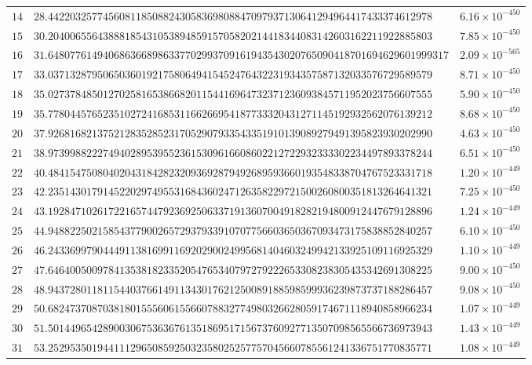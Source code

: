 \documentclass[12pt,reqno]{amsart}
\theoremstyle{remark}
\begin{document}
\begin{longtable}{clc}
$14$ & $28.4422032577456081185088243058369808847097937130641294964417433374612978$ & $6.16\times 10^{-450}$ \\
$15$ & $30.2040065564388818543105389485915705820214418344083142603162211922885803$ & $7.85\times 10^{-450}$ \\
$16$ & $31.6480776149406863668986337702993709161943543020765090418701694629601999317$ & $2.09\times 10^{-565}$ \\
$17$ & $33.0371328795065036019217580649415452476432231934357587132033576729589579$ & $8.71\times 10^{-450}$ \\
$18$ & $35.0273784850127025816538668201154416964732371236093845711952023756607555$ & $5.90\times 10^{-450}$ \\
$19$ & $35.7780445765235102724168531166266954187733320431271145192932562076139212$ & $8.68\times 10^{-450}$ \\
$20$ & $37.9268168213752128352852317052907933543351910139089279491395823930202990$ & $4.63\times 10^{-450}$ \\
$21$ & $38.9739988222749402895395523615309616608602212722932333302234497893378244$ & $6.51\times 10^{-450}$ \\
$22$ & $40.4841547508040204318428232093692879492689593660193548338704767523331718$ & $1.20\times 10^{-449}$ \\
$23$ & $42.2351430179145220297495531684360247126358229721500260800351813264641321$ & $7.25\times 10^{-450}$ \\
$24$ & $43.1928471026172216574479236925063371913607004918282194800912447679128896$ & $1.24\times 10^{-449}$ \\
$25$ & $44.9488225021585437790026572937933910707756603650367093473175838852840257$ & $6.10\times 10^{-450}$ \\
$26$ & $46.2433699790444911381699116920290024995681404603249942133925109116925329$ & $1.10\times 10^{-449}$ \\
$27$ & $47.6464005009784135381823352054765340797279222653308238305435342691308225$ & $9.00\times 10^{-450}$ \\
$28$ & $48.9437280118115440376614911343017621250089188598599936239873737188286457$ & $9.08\times 10^{-450}$ \\
$29$ & $50.6824737087038180155560615566078832774980326628059174671118940858966234$ & $1.07\times 10^{-449}$ \\
$30$ & $51.5014496542890030675363676135186951715673760927713507098565566736973943$ & $1.43\times 10^{-449}$ \\
$31$ & $53.2529535019441112965085925032358025257757045660785561241336751770835771$ & $1.08\times 10^{-449}$ \\

\end{longtable}
\end{document}
